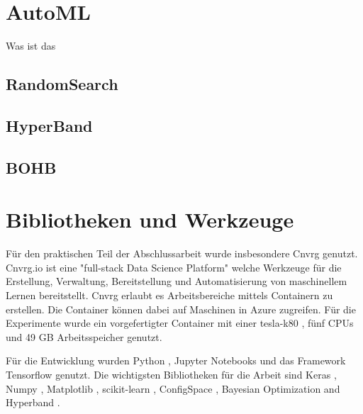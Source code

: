 	\section{AutoML}
	\label{sec:AutoML}
		Was ist das
		\subsection{RandomSearch}
		
		\subsection{HyperBand }

		\subsection{BOHB }


	\section{Bibliotheken und Werkzeuge}
	\label{sec:BibliothekenundWerkzeuge}
	Für den praktischen Teil der Abschlussarbeit wurde insbesondere Cnvrg \cite{cnvrg.io.} genutzt. Cnvrg.io ist eine "full-stack Data Science Platform" welche Werkzeuge für die Erstellung, Verwaltung, Bereitstellung und Automatisierung von maschinellem Lernen bereitstellt. Cnvrg erlaubt es Arbeitsbereiche mittels Containern zu erstellen. Die Container können dabei auf Maschinen in Azure \cite{Micorsoft.2020} zugreifen. Für die Experimente wurde ein vorgefertigter Container mit einer tesla-k80 \cite{Nvidia.2020}, fünf CPUs und 49 GB Arbeitsspeicher genutzt. 

	Für die Entwicklung wurden Python \cite{PythonSoftwareFoundation.2020}, Jupyter Notebooks \cite{ProjectJupyter} und das Framework Tensorflow \cite{MartinAbadi.2015}  genutzt. Die wichtigsten Bibliotheken für die Arbeit sind Keras \cite{Chollet.2015} , Numpy \cite{Oliphant.2006} , Matplotlib \cite{Hunter.2007} , scikit-learn \cite{Pedregosa.2011} , ConfigSpace \cite{Lindauer.8162019} , Bayesian Optimization and Hyperband \cite{StefanFalkner.2018} . 
	
